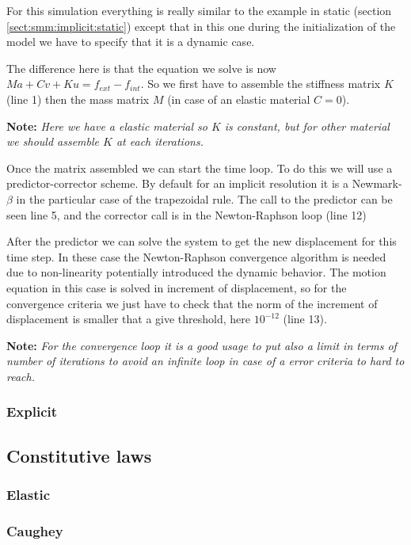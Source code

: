 \documentclass[a4paper,11pt]{book}
\newcommand{\note}[1]{\textbf{Note: }\textit{#1}}
\begin{document}
For  this simulation  everything  is really  similar  to the  example in  static
(section  \ref{sect:smm:implicit:static}) except  that  in this  one during  the
initialization of the model we have to specify that it is a dynamic case.

The difference here is that the equation we solve is now $Ma + Cv + Ku = f_{ext}
- f_{int}$. So we first have to  assemble the stiffness matrix $K$ (line 1) then
the mass matrix $M$ (in case of an elastic material $C = 0$).

\note{Here we have a elastic material so $K$ is constant, but for other material
  we should assemble $K$ at each iterations.}

Once the matrix assembled  we can start the time loop. To do  this we will use a
predictor-corrector  scheme. By  default  for  an implicit  resolution  it is  a
Newmark-$\beta$ in the particular case of the trapezoidal rule.  The call to the
predictor can  be seen line 5, and  the corrector call is  in the Newton-Raphson
loop (line 12)

After the predictor we can solve the system to get the new displacement for this
time step. In these case  the Newton-Raphson convergence algorithm is needed due
to  non-linearity  potentially  introduced  the  dynamic  behavior.  The  motion
equation  in this  case  is solved  in  increment of  displacement,  so for  the
convergence criteria  we just have  to check that  the norm of the  increment of
displacement is smaller that a give threshold, here $10^{-12}$ (line 13).

\note{For the convergence loop  it is a good usage to put  also a limit in terms
  of number of iterations to avoid an  infinite loop in case of a error criteria
  to hard to reach.}





\subsubsection{Explicit}

\subsection{Constitutive laws}
\subsubsection{Elastic}
\subsubsection{Caughey}
\end{document}
